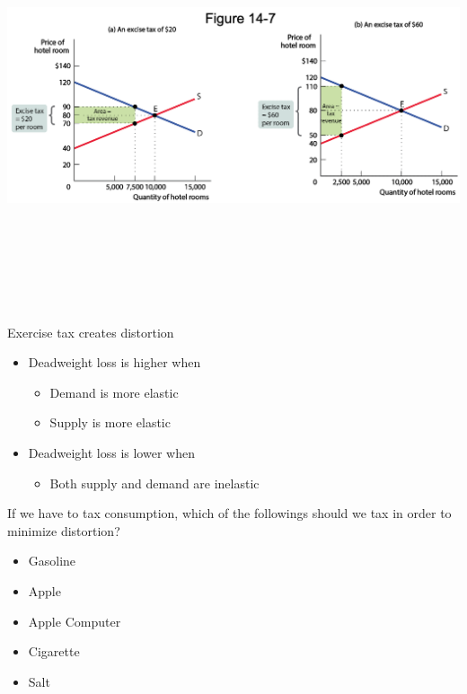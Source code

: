 \documentclass[
  ignorenonframetext,
]{beamer}
\providecommand{\tightlist}{%
  \setlength{\itemsep}{0pt}\setlength{\parskip}{0pt}}
\begin{document}
\begin{frame}{}
\protect\hypertarget{section-14}{}
\includegraphics[width=\textwidth,height=4.6875in]{figures/fig14_7.png}
\end{frame}

\begin{frame}{Exercise tax creates distortion}
\protect\hypertarget{exercise-tax-creates-distortion}{}
\begin{itemize}
\tightlist
\item
  Deadweight loss is higher when

  \begin{itemize}
  \tightlist
  \item
    Demand is more elastic
  \item
    Supply is more elastic
  \end{itemize}
\item
  Deadweight loss is lower when

  \begin{itemize}
  \tightlist
  \item
    Both supply and demand are inelastic
  \end{itemize}
\end{itemize}
\end{frame}

\begin{frame}{}
\protect\hypertarget{section-15}{}
If we have to tax consumption, which of the followings should we tax in
order to minimize distortion?

\begin{itemize}
\tightlist
\item
  Gasoline
\item
  Apple
\item
  Apple Computer
\item
  Cigarette
\item
  Salt
\end{itemize}
\end{frame}
\end{document}
